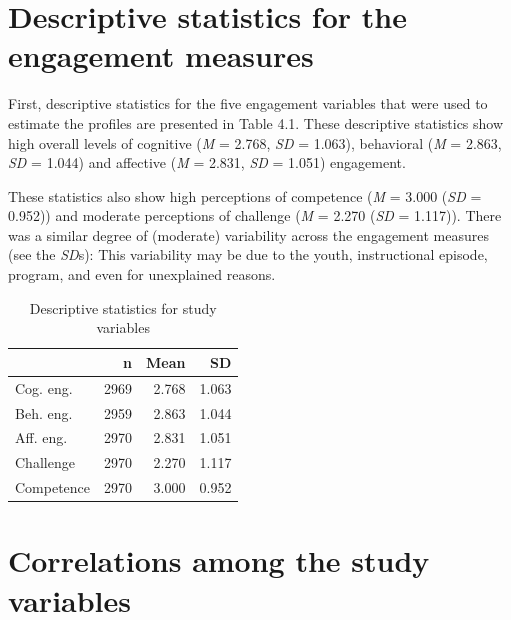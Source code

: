 \documentclass[]{msu-thesis}
\theoremstyle{definition}
\theoremstyle{definition}
\theoremstyle{definition}
\theoremstyle{remark}
\begin{document}
\section{Descriptive statistics for the engagement
measures}\label{descriptive-statistics-for-the-engagement-measures}

First, descriptive statistics for the five engagement variables that
were used to estimate the profiles are presented in Table 4.1. These
descriptive statistics show high overall levels of cognitive (\emph{M} =
2.768, \emph{SD} = 1.063), behavioral (\emph{M} = 2.863, \emph{SD} =
1.044) and affective (\emph{M} = 2.831, \emph{SD} = 1.051) engagement.

These statistics also show high perceptions of competence (\emph{M} =
3.000 (\emph{SD} = 0.952)) and moderate perceptions of challenge
(\emph{M} = 2.270 (\emph{SD} = 1.117)). There was a similar degree of
(moderate) variability across the engagement measures (see the
\emph{SD}s): This variability may be due to the youth, instructional
episode, program, and even for unexplained reasons.

\begin{table}

\caption{\label{tab:unnamed-chunk-7}Descriptive statistics for study variables}
\centering
\begin{tabular}[t]{lrrr}
\toprule
 & n & Mean & SD\\
\midrule
Cog. eng. & 2969 & 2.768 & 1.063\\
Beh. eng. & 2959 & 2.863 & 1.044\\
Aff. eng. & 2970 & 2.831 & 1.051\\
Challenge & 2970 & 2.270 & 1.117\\
Competence & 2970 & 3.000 & 0.952\\
\bottomrule
\end{tabular}
\end{table}

\section{Correlations among the study
variables}\label{correlations-among-the-study-variables}
\end{document}
